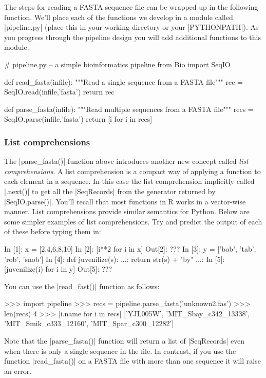 The steps for reading a FASTA sequence file can be wrapped up in the following function. We'll place each of the functions we develop in a module called |pipeline.py| (place this in your working directory or your |PYTHONPATH|).  As you progress through the pipeline design you will add additional functions to this module.

\begin{python}
# pipeline.py -- a simple bioinformatics pipeline
from Bio import SeqIO

def read_fasta(infile):
    """Read a single sequence from a FASTA file"""
    rec = SeqIO.read(infile,'fasta')
    return rec

def parse_fasta(infile):
    """Read multiple sequences from a FASTA file"""
    recs = SeqIO.parse(infile,'fasta')
    return [i for i in recs]
\end{python}

\subsubsection{List comprehensions}
The |parse_fasta()| function  above introduces another new concept called \emph{list comprehensions}. A list comprehension is a compact way of applying a function to each element in a sequence. In this case the list comprehension implicitly called |.next()| to get all the |SeqRecords| from the generator returned by |SeqIO.parse()|.  You'll recall that most functions in R works in a vector-wise manner. List comprehensions provide similar semantics for Python.  Below are some simpler examples of list comprehensions. Try and predict the output of each of these before typing them in:

\begin{python}
In [1]: x = [2,4,6,8,10]
In [2]: [i**2 for i in x]
Out[2]: ???
In [3]: y = ['bob', 'tab', 'rob', 'snob']
In [4]: def juvenilize(s):
   ...:     return str(s) + "by"
   ...:
In [5]: [juvenilize(i) for i in y]
Out[5]: ???
\end{python}

You can  use the |read_fast()| function as follows:
\begin{python}
>>> import pipeline
>>> recs = pipeline.parse_fasta('unknown2.fas')
>>> len(recs)
4
>>> [i.name for i in recs]
['YJL005W', 'MIT_Sbay_c342_13338', 'MIT_Smik_c333_12160', 'MIT_Spar_c300_12282']
\end{python}

Note that the |parse_fasta()| function will return a list of |SeqRecords| even when there is only a single sequence in the file. In contrast, if you use the function |read_fasta()| on a FASTA file with more than one sequence it will raise an error.

